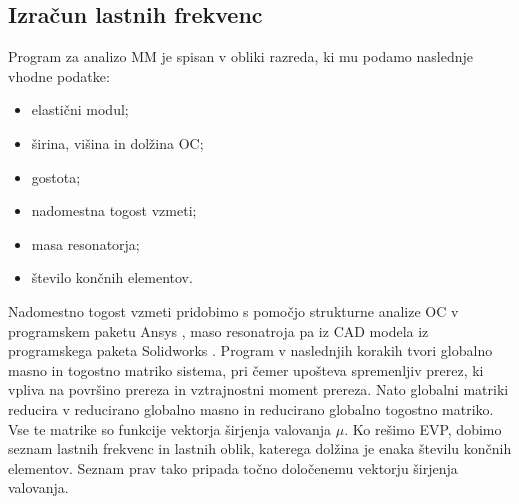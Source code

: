 \documentclass[12pt]{report}
\begin{document}
\subsection{Izračun lastnih frekvenc}
Program za analizo \ac{MM} je spisan v obliki razreda, ki mu podamo naslednje vhodne podatke:
\begin{itemize}
  \item elastični modul;
  \item širina, višina in dolžina \ac{OC};
  \item gostota;
  \item nadomestna togost vzmeti;
  \item masa resonatorja;
  \item število končnih elementov.
\end{itemize}
Nadomestno togost vzmeti pridobimo s pomočjo strukturne analize \ac{OC} v programskem paketu Ansys \cite{ansys}, maso resonatroja pa iz CAD modela iz programskega paketa Solidworks \cite{solidworks}. Program v naslednjih korakih tvori globalno masno in togostno matriko
sistema, pri čemer upošteva spremenljiv prerez, ki vpliva na površino prereza in vztrajnostni moment prereza. Nato globalni matriki reducira v reducirano globalno masno in reducirano globalno
togostno matriko. Vse te matrike so funkcije vektorja širjenja valovanja $\mu$. Ko rešimo \ac{EVP}, dobimo seznam lastnih frekvenc in lastnih oblik, katerega dolžina je enaka številu končnih elementov. Seznam prav tako pripada točno določenemu vektorju širjenja valovanja.
\end{document}

